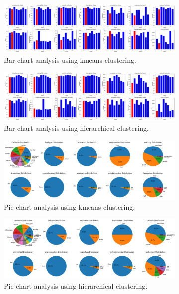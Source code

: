 \documentclass{article} %
\begin{document}
\begin{figure}[htbp]
    \centering
    \begin{subfigure}[b]{\linewidth}
        \centering
        \includegraphics[width=\linewidth]{./figures/kmeans_analysis1.png}
        \caption{Bar chart analysis using kmeans clustering.}
        \label{fig:kmeans_analysis1}
    \end{subfigure}
    \hfill
    \begin{subfigure}[b]{\linewidth}
        \centering
        \includegraphics[width=\linewidth]{./figures/hc_analysis1.png}
        \caption{Bar chart analysis using hierarchical clustering.}
        \label{fig:hc_analysis1}
    \end{subfigure}
    \begin{subfigure}[b]{\linewidth}
        \centering
        \includegraphics[width=\linewidth]{./figures/kmeans_analysis2.png}
        \caption{Pie chart analysis using kmeans clustering.}
        \label{fig:kmeans_analysis2}
    \end{subfigure}
    \hfill
    \begin{subfigure}[b]{\linewidth}
        \centering
        \includegraphics[width=\linewidth]{./figures/hc_analysis2.png}
        \caption{Pie chart analysis using hierarchical clustering.}
        \label{fig:hc_analysis2}
    \end{subfigure}
    \caption{}
    \label{fig:combined_analysis}
\end{figure}
\end{document}
